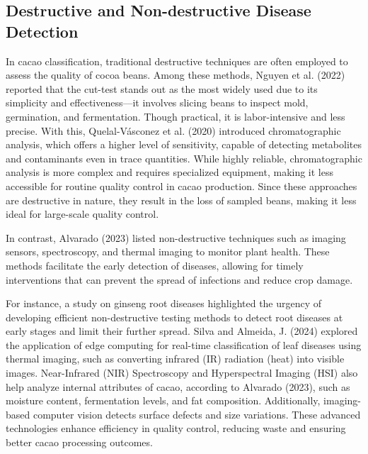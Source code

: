 \subsection{Destructive and Non-destructive Disease Detection}
In cacao classification, traditional destructive techniques are often employed to assess the quality of cocoa beans. Among these methods, Nguyen et al. (2022) reported that the cut-test stands out as the most widely used due to its simplicity and effectiveness—it involves slicing beans to inspect mold, germination, and fermentation. Though practical, it is labor-intensive and less precise. With this, Quelal-Vásconez et al. (2020) introduced chromatographic analysis, which offers a higher level of sensitivity, capable of detecting metabolites and contaminants even in trace quantities. While highly reliable, chromatographic analysis is more complex and requires specialized equipment, making it less accessible for routine quality control in cacao production. Since these approaches are destructive in nature, they result in the loss of sampled beans, making it less ideal for large-scale quality control.

In contrast, Alvarado (2023) listed non-destructive techniques such as imaging sensors, spectroscopy, and thermal imaging to monitor plant health. These methods facilitate the early detection of diseases, allowing for timely interventions that can prevent the spread of infections and reduce crop damage.

For instance, a study on ginseng root diseases highlighted the urgency of developing efficient non-destructive testing methods to detect root diseases at early stages and limit their further spread. Silva and Almeida, J. (2024) explored the application of edge computing for real-time classification of leaf diseases using thermal imaging, such as converting infrared (IR) radiation (heat) into visible images. Near-Infrared (NIR) Spectroscopy and Hyperspectral Imaging (HSI) also help analyze internal attributes of cacao, according to Alvarado (2023), such as moisture content, fermentation levels, and fat composition. Additionally, imaging-based computer vision detects surface defects and size variations. These advanced technologies enhance efficiency in quality control, reducing waste and ensuring better cacao processing outcomes.

